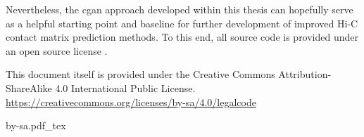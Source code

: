 Nevertheless, the \acrshort{cgan} approach developed within this thesis can hopefully serve as a helpful starting point and baseline
for further development of improved Hi-C contact matrix prediction methods.
To this end, all source code is provided under an open source license \cite{Krauth2021a, Krauth2021b}.

\begin{minipage}{0.75\textwidth}
 \raggedright
 This document itself is provided under the Creative Commons Attribution-ShareAlike 4.0 International Public License.\\
 \url{https://creativecommons.org/licenses/by-sa/4.0/legalcode}
\end{minipage}%
\begin{minipage}{0.22\textwidth}
 \raggedleft
 {by-sa.pdf_tex}
\end{minipage}
\clearpage
